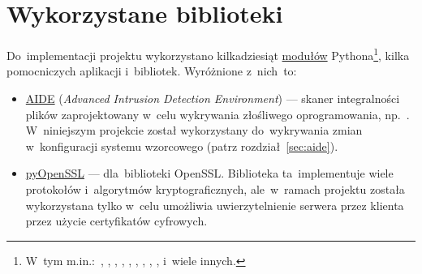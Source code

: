 \documentclass[thesis]{subfiles}
\begin{document}

\section{Wykorzystane biblioteki}
\label{sec:wykorzystane-oprogramowanie}

Do~implementacji projektu wykorzystano kilkadziesiąt \href{https://docs.python.org/dev/tutorial/modules.html}{modułów} Pythona\footnote{W~tym m.in.:~, , , , , , , , ,  i~wiele innych.}, kilka pomocniczych aplikacji i~bibliotek. Wyróżnione z~nich~to:\mynobreakpar
\begin{itemize}
	\item \href{http://aide.sourceforge.net/}{AIDE} (\emph{Advanced Intrusion Detection Environment}) --- skaner integralności plików zaprojektowany w~celu wykrywania złośliwego oprogramowania, np.~. W~niniejszym projekcie został wykorzystany do~wykrywania zmian w~konfiguracji systemu wzorcowego (patrz rozdział~\ref{sec:aide}).
	\item \href{http://www.pyopenssl.org/}{pyOpenSSL} ---  dla~biblioteki OpenSSL. Biblioteka ta~implementuje wiele protokołów i~algorytmów kryptograficznych, ale~w~ramach projektu została wykorzystana tylko w~celu umożliwia uwierzytelnienie serwera przez klienta przez użycie certyfikatów cyfrowych.
\end{itemize}
\end{document}
